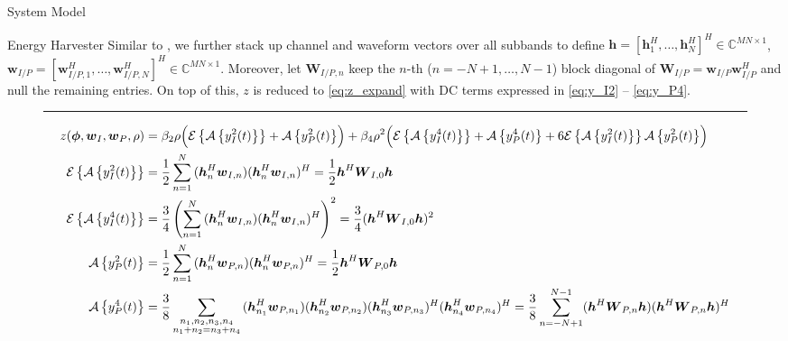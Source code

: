 \documentclass{IEEEtran}
\begin{document}
\begin{section}{System Model}
\begin{subsection}{Energy Harvester}
		Similar to \cite{Huang2017}, we further stack up channel and waveform vectors over all subbands to define $\boldsymbol{h}=[\boldsymbol{h}_1^H,\dots,\boldsymbol{h}_N^H]^H \in \mathbb{C}^{MN \times 1}$, $\boldsymbol{w}_{I/P}=[\boldsymbol{w}_{I/P,1}^H,\dots,\boldsymbol{w}_{I/P,N}^H]^H \in \mathbb{C}^{MN \times 1}$. Moreover, let $\boldsymbol{W}_{I/P,n}$ keep the $n$-th ($n=-N+1,\dots,N-1$) block diagonal of $\boldsymbol{W}_{I/P}=\boldsymbol{w}_{I/P}\boldsymbol{w}_{I/P}^H$ and null the remaining entries. On top of this, $z$ is reduced to \ref{eq:z_expand} with DC terms expressed in \ref{eq:y_I2} -- \ref{eq:y_P4}.
		\begin{figure*}[b]
			\hrule
			\begin{align}
				z(\boldsymbol{\phi},\boldsymbol{w}_I,\boldsymbol{w}_P,\rho)
				& = \beta_2\rho\Bigl(\mathcal{E}\left\{\mathcal{A}\left\{y_{I}^2(t)\right\}\right\}+\mathcal{A}\left\{y_{P}^2(t)\right\}\Bigr)+\beta_4\rho^2\Bigl(\mathcal{E}\left\{\mathcal{A}\left\{y_{I}^4(t)\right\}\right\}+\mathcal{A}\left\{y_{P}^4(t)\right\}+6\mathcal{E}\left\{\mathcal{A}\left\{y_{I}^2(t)\right\}\right\}\mathcal{A}\left\{y_{P}^2(t)\right\}\Bigr)\label{eq:z_expand}\\
				\mathcal{E}\left\{\mathcal{A}\left\{y_{I}^2(t)\right\}\right\}
				& = \frac{1}{2}\sum_{n=1}^N{(\boldsymbol{h}_{n}^H\boldsymbol{w}_{I,n})(\boldsymbol{h}_{n}^H\boldsymbol{w}_{I,n})^H} = \frac{1}{2}\boldsymbol{h}^H\boldsymbol{W}_{I,0}\boldsymbol{h}\label{eq:y_I2}\\
				\mathcal{E}\left\{\mathcal{A}\left\{y_{I}^4(t)\right\}\right\}
				& = \frac{3}{4}\left(\sum_{n=1}^N{(\boldsymbol{h}_{n}^H\boldsymbol{w}_{I,n})(\boldsymbol{h}_{n}^H\boldsymbol{w}_{I,n})^H}\right)^2 = \frac{3}{4}(\boldsymbol{h}^H\boldsymbol{W}_{I,0}\boldsymbol{h})^2\\
				\mathcal{A}\left\{y_{P}^2(t)\right\}
				& = \frac{1}{2}\sum_{n=1}^N{(\boldsymbol{h}_{n}^H\boldsymbol{w}_{P,n})(\boldsymbol{h}_{n}^H\boldsymbol{w}_{P,n})^H} = \frac{1}{2}\boldsymbol{h}^H\boldsymbol{W}_{P,0}\boldsymbol{h}\\
				\mathcal{A}\left\{y_{P}^4(t)\right\}
				& = \frac{3}{8}\sum_{\substack{{n_1},{n_2},{n_3},{n_4}\\{n_1}+{n_2}={n_3}+{n_4}}}{(\boldsymbol{h}_{{n_1}}^H\boldsymbol{w}_{P,{n_1}})(\boldsymbol{h}_{{n_2}}^H\boldsymbol{w}_{P,{n_2}})(\boldsymbol{h}_{{n_3}}^H\boldsymbol{w}_{P,{n_3}})^H(\boldsymbol{h}_{{n_4}}^H\boldsymbol{w}_{P,{n_4}})^H} = \frac{3}{8}\sum_{n=-N+1}^{N-1}(\boldsymbol{h}^H\boldsymbol{W}_{P,n}\boldsymbol{h})(\boldsymbol{h}^H\boldsymbol{W}_{P,n}\boldsymbol{h})^H\label{eq:y_P4}
			\end{align}
		\end{figure*}
	\end{subsection}


\end{section}
\end{document}
